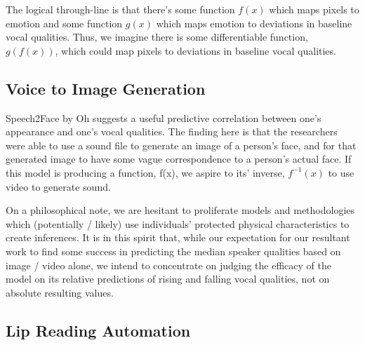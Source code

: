 \documentclass[10pt,twocolumn,letterpaper]{article}
\begin{document}
The logical through-line is that there's some function \(f(x)\) which maps pixels to emotion and some function \(g(x)\) which maps emotion to deviations in baseline vocal qualities. Thus, we imagine there is some differentiable function, \(g(f(x))\), which could map pixels to deviations in baseline vocal qualities.

\subsection{Voice to Image Generation}

Speech2Face by Oh \cite{Speech2face} suggests a useful predictive correlation between one's appearance and one's vocal qualities. The finding here is that the researchers were able to use a sound file to generate an image of a person's face, and for that generated image to have some vague correspondence to a person's actual face. If this model is producing a function, f(x), we aspire to its' inverse, \(f^{-1} (x)\) to use video to generate sound.

On a philosophical note, we are hesitant to proliferate models and methodologies which (potentially / likely) use individuals' protected physical characteristics to create inferences. It is in this spirit that, while our expectation for our resultant work to find some success in predicting the median speaker qualities based on image / video alone, we intend to concentrate on judging the efficacy of the model on its relative predictions of rising and falling vocal qualities, not on absolute resulting values.

\subsection{Lip Reading Automation}
\end{document}
